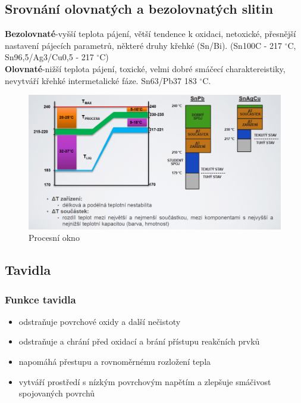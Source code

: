 \subsection{Srovnání olovnatých a bezolovnatých slitin}
\textbf{Bezolovnaté}-vyšší teplota pájení, větší tendence k oxidaci, netoxické, přesnější nastavení pájecích parametrů, některé druhy křehké (Sn/Bi). (Sn100C - 217 $^{\circ}$C, Sn96,5/Ag3/Cu0,5 - 217 $^{\circ}$C)\\
\textbf{Olovnaté}-nižší teplota pájení, toxické, velmi dobré smáčecí charaktereistiky, nevytváří křehké intermetalické fáze. Sn63/Pb37 183 $^{\circ}$C.
\begin{figure}[h]
   \begin{center}
     \includegraphics[scale=0.6]{images/Okno.png}
   \end{center}
   \caption{Procesní okno}
\end{figure}

\subsection{Tavidla}
\subsubsection{Funkce tavidla}
\begin{itemize}
\item odstraňuje povrchové oxidy a další nečistoty
\item odstraňuje a chrání před oxidací a brání přístupu reakčních prvků
\item napomáhá přestupu a rovnoměrnému rozložení tepla
\item vytváří prostředí s nízkým povrchovým napětím a zlepšuje smáčivost spojovaných
povrchů
\end{itemize}

